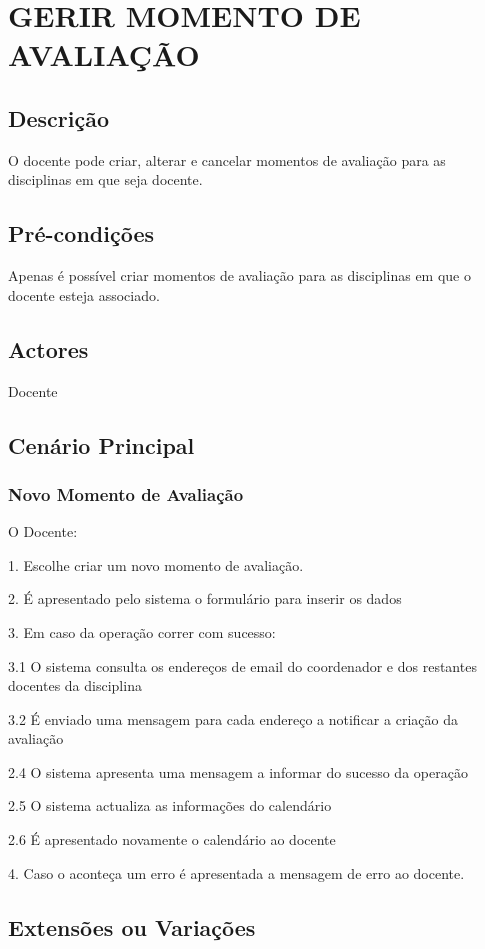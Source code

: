 \section{GERIR MOMENTO DE AVALIAÇÃO}
\subsection{Descrição} 
O docente pode criar, alterar e cancelar momentos de avaliação para as disciplinas em que seja docente.

\subsection{Pré-condições}
Apenas é possível criar momentos de avaliação para as disciplinas em que o docente esteja associado.

\subsection{Actores} 
Docente 

\subsection{Cenário Principal}
 \subsubsection{Novo Momento de Avaliação}
O Docente:

1. Escolhe criar um novo momento de avaliação.

2. É apresentado pelo sistema o formulário para inserir os dados

3. Em caso da operação correr com sucesso:

3.1 O sistema consulta os endereços de email do coordenador e dos restantes docentes da disciplina

3.2 É enviado uma mensagem para cada endereço a notificar a criação da avaliação

2.4 O sistema apresenta uma mensagem a informar do sucesso da operação

2.5 O sistema actualiza as informações do calendário

2.6 É apresentado novamente o calendário ao docente

4. Caso o aconteça um erro é apresentada a mensagem de erro ao docente.\\ 

\subsection{Extensões ou Variações} 
